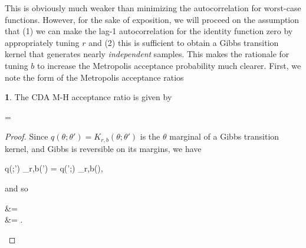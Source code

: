 \documentclass[a4paper,11pt]{article}%
\theoremstyle{example} \theoremstyle{remark} \theoremstyle{lemma}
\theoremstyle{definition} \theoremstyle{corol}
\theoremstyle{proposition} \theoremstyle{condition}
\theoremstyle{assumption}
\newtheorem{remark}{\n{Remark}}[section]
\newcommand{\1}{\\[1ex]}
\newcommand{\2}{\\[2ex]}
\newcommand{\3}{\\[3ex]}
\newcommand{\4}{\\[4ex]}
\def \be{\begin{equs}}
\def \ee{\end{equs}}
\begin{document}
This is obviously much weaker than minimizing the autocorrelation for worst-case functions. However, for the sake of exposition, we will proceed on the assumption that (1) we can make the lag-1 autocorrelation for the identity function zero by appropriately tuning $r$ and (2) this is sufficient to obtain a Gibbs transition kernel that generates nearly \emph{independent} samples. This makes the rationale for tuning $b$ to increase the Metropolis acceptance probability much clearer. First, we note the form of the Metropolis acceptance ratios
\begin{remark}
The CDA M-H acceptance ratio is given by
\be
{} =  \label{eq:mh-accrat}
\ee
\end{remark}
\begin{proof}
Since $q(\theta;\theta') = K_{r,b}(\theta;\theta')$ is the $\theta$ marginal of a Gibbs transition kernel, and Gibbs is reversible on its margins, we have
\be
q(\theta;\theta') \Pi_{r,b}(\theta') = q(\theta';\theta) \Pi_{r,b}(\theta),
\ee 
and so
\be
{} &=  \\
&= .
\ee
\end{proof}
\end{document}
